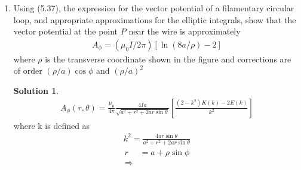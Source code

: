 \documentclass[letter,12pt]{article}
\theoremstyle{definition}
\newtheorem*{sol}{Solution}
\begin{document}
\begin{enumerate}
\begin{figure}[H]
      \end{figure}
        \begin{enumerate}
            \item
                Using (5.37), the expression for the vector potential
                of a filamentary circular loop, and appropriate
                approximations for the elliptic integrals, show that
                the vector potential at the point $P$ near the wire is
                approximately
                \begin{align*}
                    A_\phi = (\mu_0 I / 2\pi) [\ln(8a / \rho) - 2]
                \end{align*}
                where $\rho$ is the transverse coordinate shown in the
                figure and corrections are of order $(\rho/a) \cos \phi$
                and ${(\rho / a)}^2$
                \begin{sol}
                    \begin{align*}
                        A_\phi(r, \theta)
                        =
                        \frac{\mu_0}{4\pi}
                        \frac{4Ia}{\sqrt{a^2 + r^2 + 2ar \sin \theta}}
                        \left[
                            \frac{(2-k^2)K(k) - 2E(k)}{k^2}
                        \right]
                    \end{align*}
                    where k is defined as
                    \begin{align*}
                        k^2 = \frac{4ar \sin \theta}{a^2 + r^2 + 2ar\sin\theta}
                    \end{align*}
                    \begin{align*}
                        r &= a + \rho \sin \phi
                        \\
                        \Rightarrow

\end{align*}
\end{sol}
\end{enumerate}
\end{enumerate}
\end{document}
